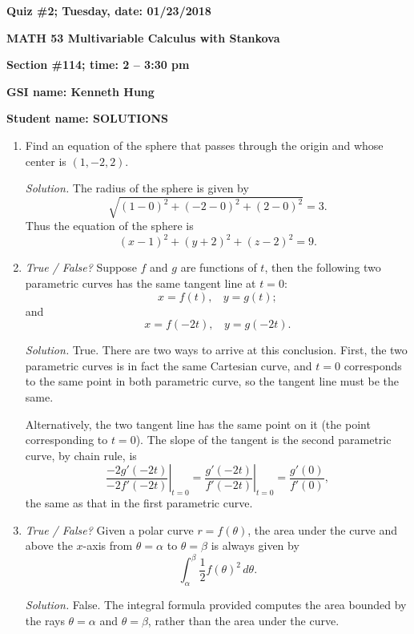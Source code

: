 \documentclass{article}
\begin{document}
{\bf Quiz \#2; Tuesday, date: 01/23/2018}

{\bf MATH 53 Multivariable Calculus with Stankova}

{\bf Section \#114; time: 2 -- 3:30 pm}

{\bf GSI name: Kenneth Hung}

{\bf Student name: SOLUTIONS}

\vspace*{0.25in}

\begin{enumerate}
\item Find an equation of the sphere that passes through the origin and whose center is $(1, -2, 2)$.

{\em Solution.} The radius of the sphere is given by
\[
\sqrt{(1 - 0)^2 + (-2 - 0)^2 + (2 - 0)^2} = 3.
\]
Thus the equation of the sphere is
\[
(x - 1)^2 + (y + 2)^2 + (z - 2)^2 = 9.
\]

\item {\em True / False?} Suppose $f$ and $g$ are functions of $t$, then the following two parametric curves has the same tangent line at $t = 0$:
\[
x = f(t), ~~~~ y = g(t);
\]
and
\[
x = f(-2t), ~~~~ y = g(-2t).
\]

{\em Solution.} True. There are two ways to arrive at this conclusion. First, the two parametric curves is in fact the same Cartesian curve, and $t = 0$ corresponds to the same point in both parametric curve, so the tangent line must be the same.

Alternatively, the two tangent line has the same point on it (the point corresponding to $t = 0$). The slope of the tangent is the second parametric curve, by chain rule, is
\[
\left.\frac{-2g'(-2t)}{-2f'(-2t)}\right|_{t = 0} = \left.\frac{g'(-2t)}{f'(-2t)}\right|_{t = 0} = \frac{g'(0)}{f'(0)},
\]
the same as that in the first parametric curve.

\item {\em True / False?} Given a polar curve $r = f(\theta)$, the area under the curve and above the $x$-axis from $\theta = \alpha$ to $\theta = \beta$ is always given by
\[
\int_\alpha^\beta \frac{1}{2} f(\theta)^2 \,d\theta.
\]

{\em Solution.} False. The integral formula provided computes the area bounded by the rays $\theta = \alpha$ and $\theta = \beta$, rather than the area under the curve.

\end{enumerate}
\end{document}
